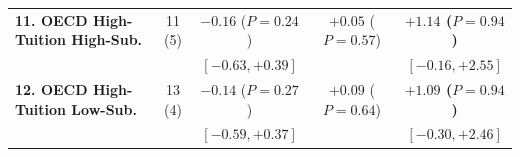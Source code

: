 \documentclass[11pt,a4paper]{article}
\newcommand{\co}{\cellcolor{colodd}}
\newcommand{\ce}{\cellcolor{coleven}}
\begin{document}
\begin{table}[htbp]
{\begin{tabular}{l|c|c|c|c}
    \hline
    \rowcolor{rowodd}
    \textbf{11. OECD High-Tuition High-Sub.} & \co 11 (5) & $-0.16$ ($P=0.24$) & \co $+0.05$ ($P=0.57$) & \textbf{$+1.14$ ($P=0.94$)} \\
    \rowcolor{rowodd}
                                               & \co & {\scriptsize $[-0.63, +0.39]$} & \co {\scriptsize $[-0.34, +0.50]$} & {\scriptsize $[-0.16, +2.55]$} \\
    \hline
    \rowcolor{roweven}
    \textbf{12. OECD High-Tuition Low-Sub.} & \ce 13 (4) & $-0.14$ ($P=0.27$) & \ce $+0.09$ ($P=0.64$) & \textbf{$+1.09$ ($P=0.94$)} \\
    \rowcolor{roweven}
                                               & \ce & {\scriptsize $[-0.59, +0.37]$} & \ce {\scriptsize $[-0.31, +0.49]$} & {\scriptsize $[-0.30, +2.46]$} \\
    \bottomrule
  \end{tabular}%
  }
\end{table}
\end{document}
